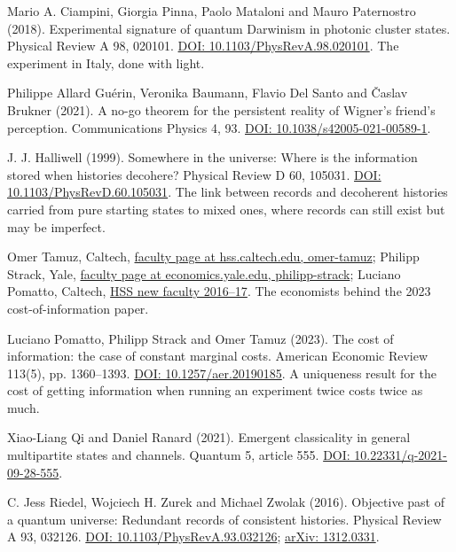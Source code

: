 \documentclass[11pt,twoside]{article}
\theoremstyle{thielethm}
\theoremstyle{thieledef}
\theoremstyle{thieledef}
\theoremstyle{thieledef}
\theoremstyle{thielethm}
\theoremstyle{thieleobs}
\theoremstyle{thielethm}
\begin{document}
\noindent Mario A. Ciampini, Giorgia Pinna, Paolo Mataloni and Mauro Paternostro (2018). Experimental signature of quantum Darwinism in photonic cluster states. Physical Review A 98, 020101. \href{https://doi.org/10.1103/PhysRevA.98.020101}{DOI: 10.1103/PhysRevA.98.020101}. The experiment in Italy, done with light.
\par\medskip

\noindent Philippe Allard Gu\'erin, Veronika Baumann, Flavio Del Santo and \v{C}aslav Brukner (2021). A no-go theorem for the persistent reality of Wigner's friend's perception. Communications Physics 4, 93. \href{https://doi.org/10.1038/s42005-021-00589-1}{DOI: 10.1038/s42005-021-00589-1}.
\par\medskip

\noindent J. J. Halliwell (1999). Somewhere in the universe: Where is the information stored when histories decohere? Physical Review D 60, 105031. \href{https://doi.org/10.1103/PhysRevD.60.105031}{DOI: 10.1103/PhysRevD.60.105031}. The link between records and decoherent histories carried from pure starting states to mixed ones, where records can still exist but may be imperfect.
\par\medskip

\noindent Omer Tamuz, Caltech, \href{https://www.hss.caltech.edu/people/omer-tamuz}{faculty page at hss.caltech.edu, omer-tamuz}; Philipp Strack, Yale, \href{https://economics.yale.edu/people/philipp-strack}{faculty page at economics.yale.edu, philipp-strack}; Luciano Pomatto, Caltech, \href{https://hss.caltech.edu/documents/3303/HSS_New_Faces_2016-2017_FINAL.pdf}{HSS new faculty 2016--17}. The economists behind the 2023 cost-of-information paper.
\par\medskip

\noindent Luciano Pomatto, Philipp Strack and Omer Tamuz (2023). The cost of information: the case of constant marginal costs. American Economic Review 113(5), pp. 1360--1393. \href{https://doi.org/10.1257/aer.20190185}{DOI: 10.1257/aer.20190185}. A uniqueness result for the cost of getting information when running an experiment twice costs twice as much.
\par\medskip

\noindent Xiao-Liang Qi and Daniel Ranard (2021). Emergent classicality in general multipartite states and channels. Quantum 5, article 555. \href{https://doi.org/10.22331/q-2021-09-28-555}{DOI: 10.22331/q-2021-09-28-555}.
\par\medskip

\noindent C. Jess Riedel, Wojciech H. Zurek and Michael Zwolak (2016). Objective past of a quantum universe: Redundant records of consistent histories. Physical Review A 93, 032126. \href{https://doi.org/10.1103/PhysRevA.93.032126}{DOI: 10.1103/PhysRevA.93.032126}; \href{https://arxiv.org/abs/1312.0331}{arXiv: 1312.0331}.
\par\medskip
\end{document}
